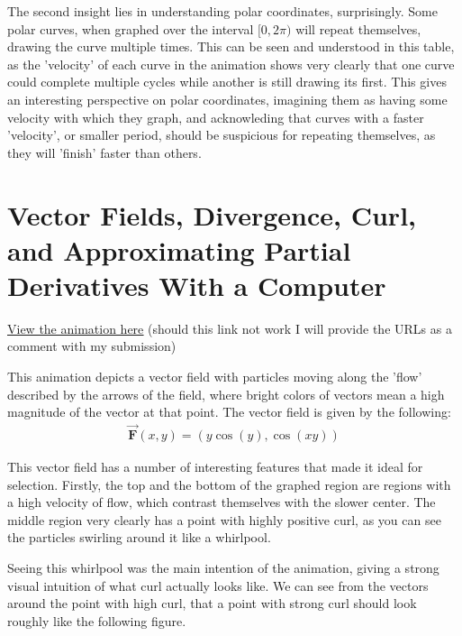 \documentclass{article}
\begin{document}
    The second insight lies in understanding polar coordinates, surprisingly.
    Some polar curves, when graphed over the interval $[0, 2\pi)$ will repeat themselves, drawing the curve multiple times.
    This can be seen and understood in this table, as the 'velocity' of each curve in the animation shows very clearly that
    one curve could complete multiple cycles while another is still drawing its first.
    This gives an interesting perspective on polar coordinates, imagining them as having some velocity with which they graph,
    and acknowleding that curves with a faster 'velocity', or smaller period, should be suspicious for repeating themselves, as they will 'finish' faster than others.

    \section{Vector Fields, Divergence, Curl, and Approximating Partial Derivatives With a Computer}
    \underline{\href{https://saxten2011.github.io/VectorField/}{View the animation here}} (should this link not work I will provide the URLs as a comment with my submission)

    This animation depicts a vector field with particles moving along the 'flow' described by the arrows of the field, where bright colors of vectors mean a high magnitude of the vector at that point.
    The vector field is given by the following:
    \begin{gather*}
        \vec{ \mathbf{F} } (x, y) = (y \cos(y), \cos(xy)) 
    \end{gather*}

    This vector field has a number of interesting features that made it ideal for selection.
    Firstly, the top and the bottom of the graphed region are regions with a high velocity of flow, which contrast themselves with the slower center.
    The middle region very clearly has a point with highly positive curl, as you can see the particles swirling around it like a whirlpool.

    Seeing this whirlpool was the main intention of the animation, giving a strong visual intuition of what curl actually looks like.
    We can see from the vectors around the point with high curl, that a point with strong curl should look roughly like the following figure.


    \begin{figure}[!h]
        \centering
    \end{figure}
\end{document}
